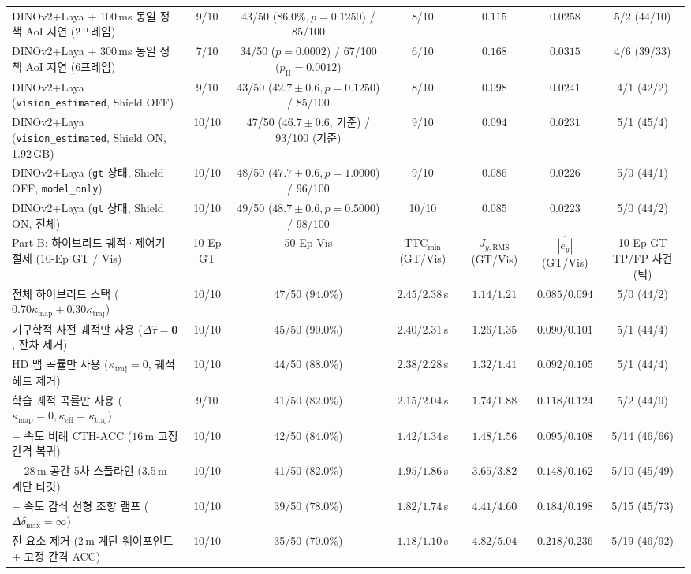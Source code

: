 \documentclass[10pt,twocolumn,a4paper]{article}
\begin{document}
\begin{table}[t]
{\begin{tabular}{lcccccc}
DINOv2+Laya + 100\,ms 동일 정책 AoI 지연 (2프레임) & 9/10 & 43/50 ($86.0\%, p{=}0.1250$) / 85/100 & 8/10 & $0.115$ & $0.0258$ & 5/2 (44/10) \\
DINOv2+Laya + 300\,ms 동일 정책 AoI 지연 (6프레임) & 7/10 & 34/50 ($p{=}0.0002$) / 67/100 ($p_{\text{H}}{=}0.0012$) & 6/10 & $0.168$ & $0.0315$ & 4/6 (39/33) \\
DINOv2+Laya (\texttt{vision\_estimated}, Shield OFF) & 9/10 & 43/50 ($42.7{\pm}0.6, p{=}0.1250$) / 85/100 & 8/10 & $0.098$ & $0.0241$ & 4/1 (42/2) \\
DINOv2+Laya (\texttt{vision\_estimated}, Shield ON, 1.92\,GB) & 10/10 & 47/50 ($46.7{\pm}0.6$, 기준) / 93/100 (기준) & 9/10 & $0.094$ & $0.0231$ & 5/1 (45/4) \\
DINOv2+Laya (\texttt{gt} 상태, Shield OFF, \texttt{model\_only}) & 10/10 & 48/50 ($47.7{\pm}0.6, p{=}1.0000$) / 96/100 & 9/10 & $0.086$ & $0.0226$ & 5/0 (44/1) \\
DINOv2+Laya (\texttt{gt} 상태, Shield ON, 전체) & 10/10 & 49/50 ($48.7{\pm}0.6, p{=}0.5000$) / 98/100 & 10/10 & $0.085$ & $0.0223$ & 5/0 (44/2) \\
\midrule
Part B: 하이브리드 궤적·제어기 절제 (10-Ep GT / Vis) & 10-Ep GT & 50-Ep Vis & $\text{TTC}_{\min}$ (GT/Vis) & $J_{y,\text{RMS}}$ (GT/Vis) & $\overline{|e_y|}$ (GT/Vis) & 10-Ep GT TP/FP 사건 (틱) \\
\midrule
전체 하이브리드 스택 ($0.70\kappa_{\text{map}} + 0.30\kappa_{\text{traj}}$) & 10/10 & 47/50 ($94.0\%$) & $2.45 / 2.38$\,s & $1.14 / 1.21$ & $0.085 / 0.094$ & 5/0 (44/2) \\
기구학적 사전 궤적만 사용 ($\Delta\hat{\tau}=\mathbf{0}$, 잔차 제거) & 10/10 & 45/50 ($90.0\%$) & $2.40 / 2.31$\,s & $1.26 / 1.35$ & $0.090 / 0.101$ & 5/1 (44/4) \\
HD 맵 곡률만 사용 ($\kappa_{\text{traj}}=0$, 궤적 헤드 제거) & 10/10 & 44/50 ($88.0\%$) & $2.38 / 2.28$\,s & $1.32 / 1.41$ & $0.092 / 0.105$ & 5/1 (44/4) \\
학습 궤적 곡률만 사용 ($\kappa_{\text{map}}=0, \kappa_{\text{eff}}=\kappa_{\text{traj}}$) & 9/10 & 41/50 ($82.0\%$) & $2.15 / 2.04$\,s & $1.74 / 1.88$ & $0.118 / 0.124$ & 5/2 (44/9) \\
$-$ 속도 비례 CTH-ACC ($16\,\text{m}$ 고정 간격 복귀) & 10/10 & 42/50 ($84.0\%$) & $1.42 / 1.34$\,s & $1.48 / 1.56$ & $0.095 / 0.108$ & 5/14 (46/66) \\
$-$ 28\,m 공간 5차 스플라인 (3.5\,m 계단 타깃) & 10/10 & 41/50 ($82.0\%$) & $1.95 / 1.86$\,s & $3.65 / 3.82$ & $0.148 / 0.162$ & 5/10 (45/49) \\
$-$ 속도 감쇠 선형 조향 램프 ($\Delta\delta_{\max}=\infty$) & 10/10 & 39/50 ($78.0\%$) & $1.82 / 1.74$\,s & $4.41 / 4.60$ & $0.184 / 0.198$ & 5/15 (45/73) \\
전 요소 제거 (2\,m 계단 웨이포인트 + 고정 간격 ACC) & 10/10 & 35/50 ($70.0\%$) & $1.18 / 1.10$\,s & $4.82 / 5.04$ & $0.218 / 0.236$ & 5/19 (46/92) \\
\bottomrule
\end{tabular}%
}
\end{table}
\end{document}
